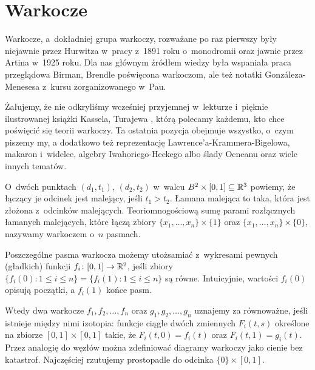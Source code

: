 %

\section{Warkocze}
\label{sec:braid}%
%
Warkocze, a~dokładniej grupa warkoczy, rozważane po raz pierwszy były niejawnie przez Hurwitza w~pracy z~1891 roku o~monodromii oraz jawnie przez Artina \cite{artin1925} w~1925 roku.
%
Dla nas głównym źródłem wiedzy była wspaniała praca przeglądowa Birman, Brendle \cite{birman2005} poświęcona warkoczom, ale też notatki Gonzáleza-Menesesa \cite{gonzalez2011} z~kursu zorganizowanego w~Pau.
%
%
%

Żałujemy, że nie odkryliśmy wcześniej przyjemnej w~lekturze i~pięknie ilustrowanej książki Kassela, Turajewa \cite{kassel2008}, którą polecamy każdemu, kto chce poświęcić się teorii warkoczy.
%
%
Ta ostatnia pozycja obejmuje wszystko, o~czym piszemy my, a dodatkowo też reprezentację Lawrence'a-Krammera-Bigelowa, makaron i~widelce, algebry Iwahoriego-Heckego albo ślady Ocneanu oraz wiele innych tematów.
%
%
%
%

\begin{definition}[warkocz]
%
O~dwóch punktach $(d_1, t_1)$, $(d_2, t_2)$ w~walcu $B^2 \times [0, 1] \subseteq \mathbb R^3$ powiemy, że łączący je odcinek jest malejący, jeśli $t_1 > t_2$.
Łamana malejąca to taka, która jest złożona z~odcinków malejących.
Teoriomnogościową sumę parami rozłącznych łamanych malejących, które łączą zbiory $\{x_1, \ldots, x_n\} \times \{1\}$ oraz $\{x_1, \ldots, x_n\} \times \{0\}$, nazywamy warkoczem o~$n$ pasmach.
\end{definition}

Poszczególne pasma warkocza możemy utożsamiać z~wykresami pewnych (gładkich) funkcji $f_i \colon [0, 1] \to \mathbb R^2$, jeśli zbiory $\{f_i(0) : 1 \le i \le n\} = \{f_i(1) : 1 \le i \le n\}$ są równe.
Intuicyjnie, wartości $f_i(0)$ opisują początki, a $f_i(1)$ końce pasm.

Wtedy dwa warkocze $f_1, f_2, \ldots, f_n$ oraz $g_1, g_2, \ldots, g_n$ uznajemy za równoważne, jeśli istnieje między nimi izotopia: funkcje ciągłe dwóch zmiennych $F_i(t, s)$ określone na zbiorze $[0,1] \times [0,1]$ takie, że $F_i(t,0)= f_i(t)$ oraz $F_i(t, 1) = g_i(t)$.
Przez analogię do węzłów można zdefiniować diagramy warkoczy jako cienie bez katastrof.
Najczęściej rzutujemy prostopadle do odcinka $\{0\} \times [0, 1]$.

